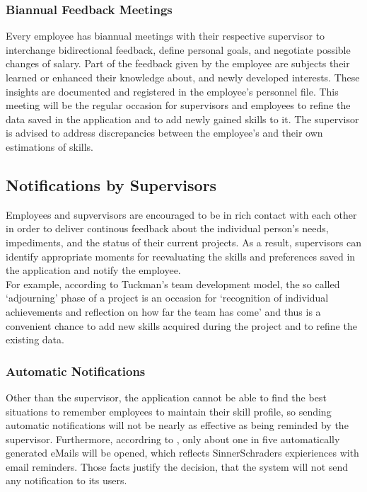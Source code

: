 \subsubsection{Biannual Feedback Meetings}
Every employee has biannual meetings with their respective supervisor to interchange
bidirectional feedback, define personal goals, and negotiate possible changes of salary.
Part of the feedback given by the employee are subjects their learned or enhanced their knowledge about, and newly developed interests. These insights are documented and registered in the employee's personnel file.
This meeting will be the regular occasion for supervisors and employees to refine the data saved in the application and to add
newly gained skills to it. The supervisor is advised to address discrepancies between the employee's and their own estimations of skills.

\subsection{Notifications by Supervisors}
Employees and supvervisors are encouraged to be in rich contact with each other in order to deliver continous feedback
about the individual person's needs, impediments, and the status of their current projects.
As a result, supervisors can identify appropriate moments for reevaluating the skills and preferences saved in the application and notify the employee.\\
For example, according to Tuckman's team development model, the so called `adjourning' phase of a project is an occasion for `recognition of individual achievements and reflection on how far the team has come' \cite[P. 3]{Wilson} and thus is a convenient chance to add new skills acquired during the project and to refine the existing data.

\subsubsection{Automatic Notifications}
Other than the supervisor, the application cannot be able to find the best situations to remember employees to maintain their skill profile, so sending automatic notifications will not be nearly as effective as being reminded by the supervisor. Furthermore, accordring to \cite{mailrep}, only
about one in five automatically generated eMails will be opened, which reflects SinnerSchraders
expieriences with email reminders. Those facts justify the decision, that the system will not send any notification to its users.

